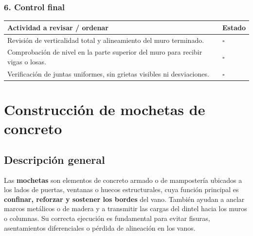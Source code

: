 \documentclass[12pt]{article}
\newcommand{\cbox}{\(\square\)}
\renewcommand{\cbox}{\(\square\)} %
\begin{document}
	\subsubsection*{6. Control final}
	\begin{tabularx}{\linewidth}{>{\raggedright\arraybackslash}p{0.93\linewidth} >{\centering\arraybackslash}m{0.07\linewidth}}
		\toprule
		\textbf{Actividad a revisar / ordenar} & \textbf{Estado}\\
		\midrule
		Revisión de verticalidad total y alineamiento del muro terminado. & \cbox \\
		Comprobación de nivel en la parte superior del muro para recibir vigas o losas. & \cbox \\
		Verificación de juntas uniformes, sin grietas visibles ni desviaciones. & \cbox \\
		\bottomrule
	\end{tabularx}
	
	
	
		
	
	
		
	\section{Construcción de mochetas de concreto}
	
	\subsection*{Descripción general}
	Las \textbf{mochetas} son elementos de concreto armado o de mampostería ubicados a los lados de puertas, ventanas o huecos estructurales, cuya función principal es \textbf{confinar, reforzar y sostener los bordes} del vano. También ayudan a anclar marcos metálicos o de madera y a transmitir las cargas del dintel hacia los muros o columnas. Su correcta ejecución es fundamental para evitar fisuras, asentamientos diferenciales o pérdida de alineación en los vanos.
	
\end{document}
